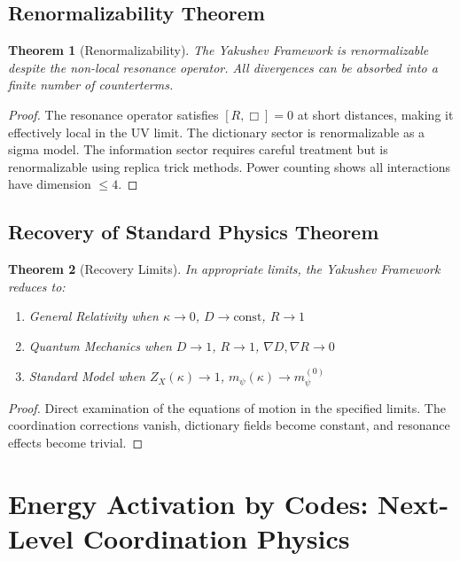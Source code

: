 \documentclass[11pt,a4paper]{article}
\newtheorem{theorem}{Theorem}
\begin{document}
	\subsection{Renormalizability Theorem}
	
	\begin{theorem}[Renormalizability]
		The Yakushev Framework is renormalizable despite the non-local resonance operator. All divergences can be absorbed into a finite number of counterterms.
	\end{theorem}
	
	\begin{proof}
		The resonance operator satisfies $[R, \Box] = 0$ at short distances, making it effectively local in the UV limit. The dictionary sector is renormalizable as a sigma model. The information sector requires careful treatment but is renormalizable using replica trick methods. Power counting shows all interactions have dimension $\leq 4$.
	\end{proof}
	
	\subsection{Recovery of Standard Physics Theorem}
	
	\begin{theorem}[Recovery Limits]
		In appropriate limits, the Yakushev Framework reduces to:
		\begin{enumerate}
			\item General Relativity when $\kappa \to 0$, $D \to \text{const}$, $R \to 1$
			\item Quantum Mechanics when $D \to 1$, $R \to 1$, $\nabla D, \nabla R \to 0$
			\item Standard Model when $Z_X(\kappa) \to 1$, $m_\psi(\kappa) \to m_\psi^{(0)}$
		\end{enumerate}
	\end{theorem}
	
	\begin{proof}
		Direct examination of the equations of motion in the specified limits. The coordination corrections vanish, dictionary fields become constant, and resonance effects become trivial.
	\end{proof}
	\section{Energy Activation by Codes: Next-Level Coordination Physics}
	\label{sec:energy-activation}
	
\end{document}
